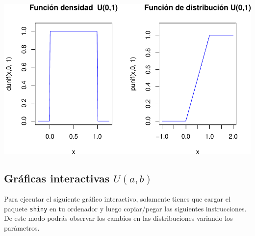 \documentclass[]{book}
\begin{document}
\begin{center}\includegraphics{curso-probabilidad-udemy_files/figure-latex/grafica_unif10_vista-1} \end{center}

\hypertarget{gruxe1ficas-interactivas-uab}{%
\subsection{\texorpdfstring{Gráficas interactivas \(U(a,b)\)}{Gráficas interactivas U(a,b)}}\label{gruxe1ficas-interactivas-uab}}

Para ejecutar el siguiente gráfico interactivo, solamente tienes que cargar el paquete \texttt{shiny} en tu ordenador y luego copiar/pegar las siguientes instrucciones. De este modo podrás observar los cambios en las distribuciones variando los parámetros.
\end{document}
